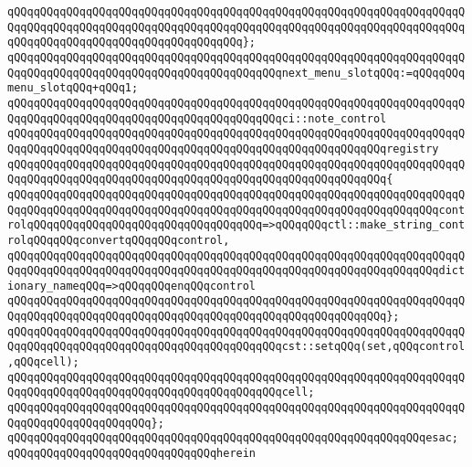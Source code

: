\verb|qQQqqQQqqQQqqQQqqQQqqQQqqQQqqQQqqQQqqQQqqQQqqQQqqQQqqQQqqQQqqQQqqQQqqQQqqQQqqQQqqQQqqQQqqQQqqQQqqQQqqQQqqQQqqQQqqQQqqQQqqQQqqQQqqQQqqQQqqQQqqQQqqQQqqQQqqQQqqQQqqQQqqQQqqQQqqQQq};|\newline
\newline
\verb|qQQqqQQqqQQqqQQqqQQqqQQqqQQqqQQqqQQqqQQqqQQqqQQqqQQqqQQqqQQqqQQqqQQqqQQqqQQqqQQqqQQqqQQqqQQqqQQqqQQqqQQqqQQqqQQqnext_menu_slotqQQq:=qQQqqQQqmenu_slotqQQq+qQQq1;|\newline
\newline
\verb|qQQqqQQqqQQqqQQqqQQqqQQqqQQqqQQqqQQqqQQqqQQqqQQqqQQqqQQqqQQqqQQqqQQqqQQqqQQqqQQqqQQqqQQqqQQqqQQqqQQqqQQqqQQqqQQqci::note_control|\newline
\verb|qQQqqQQqqQQqqQQqqQQqqQQqqQQqqQQqqQQqqQQqqQQqqQQqqQQqqQQqqQQqqQQqqQQqqQQqqQQqqQQqqQQqqQQqqQQqqQQqqQQqqQQqqQQqqQQqqQQqqQQqqQQqqQQqregistry|\newline
\verb|qQQqqQQqqQQqqQQqqQQqqQQqqQQqqQQqqQQqqQQqqQQqqQQqqQQqqQQqqQQqqQQqqQQqqQQqqQQqqQQqqQQqqQQqqQQqqQQqqQQqqQQqqQQqqQQqqQQqqQQqqQQqqQQq{|\newline
\verb|qQQqqQQqqQQqqQQqqQQqqQQqqQQqqQQqqQQqqQQqqQQqqQQqqQQqqQQqqQQqqQQqqQQqqQQqqQQqqQQqqQQqqQQqqQQqqQQqqQQqqQQqqQQqqQQqqQQqqQQqqQQqqQQqqQQqqQQqcontrolqQQqqQQqqQQqqQQqqQQqqQQqqQQqqQQqqQQq=>qQQqqQQqctl::make_string_controlqQQqqQQqconvertqQQqqQQqcontrol,|\newline
\verb|qQQqqQQqqQQqqQQqqQQqqQQqqQQqqQQqqQQqqQQqqQQqqQQqqQQqqQQqqQQqqQQqqQQqqQQqqQQqqQQqqQQqqQQqqQQqqQQqqQQqqQQqqQQqqQQqqQQqqQQqqQQqqQQqqQQqqQQqdictionary_nameqQQq=>qQQqqQQqenqQQqcontrol|\newline
\verb|qQQqqQQqqQQqqQQqqQQqqQQqqQQqqQQqqQQqqQQqqQQqqQQqqQQqqQQqqQQqqQQqqQQqqQQqqQQqqQQqqQQqqQQqqQQqqQQqqQQqqQQqqQQqqQQqqQQqqQQqqQQqqQQq};|\newline
\newline
\verb|qQQqqQQqqQQqqQQqqQQqqQQqqQQqqQQqqQQqqQQqqQQqqQQqqQQqqQQqqQQqqQQqqQQqqQQqqQQqqQQqqQQqqQQqqQQqqQQqqQQqqQQqqQQqqQQqcst::setqQQq(set,qQQqcontrol,qQQqcell);|\newline
\verb|qQQqqQQqqQQqqQQqqQQqqQQqqQQqqQQqqQQqqQQqqQQqqQQqqQQqqQQqqQQqqQQqqQQqqQQqqQQqqQQqqQQqqQQqqQQqqQQqqQQqqQQqqQQqqQQqcell;|\newline
\verb|qQQqqQQqqQQqqQQqqQQqqQQqqQQqqQQqqQQqqQQqqQQqqQQqqQQqqQQqqQQqqQQqqQQqqQQqqQQqqQQqqQQqqQQqqQQq};|\newline
\verb|qQQqqQQqqQQqqQQqqQQqqQQqqQQqqQQqqQQqqQQqqQQqqQQqqQQqqQQqqQQqqQQqesac;|\newline
\newline
\verb|qQQqqQQqqQQqqQQqqQQqqQQqqQQqqQQqherein|\newline
